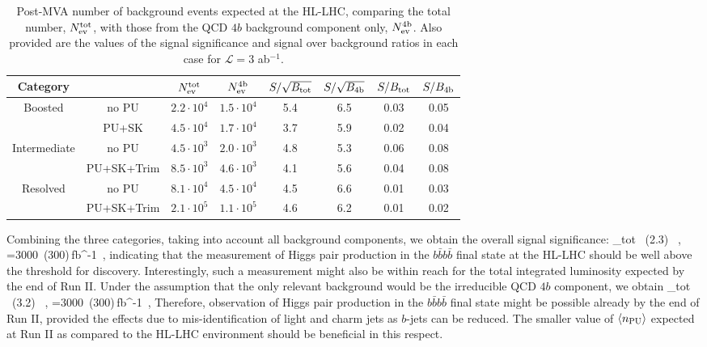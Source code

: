 \begin{table}[h]
  \centering
  \small
  \begin{tabular}{|c|c|c|c||c|c||c|c|}
        \hline
        Category  &    &  $N_{\rm ev}^{\rm tot}$  &  $N_{\rm ev}^{\rm 4b}$   &
        $S/\sqrt{B_{\rm tot}}$ & $S/\sqrt{B_{\rm 4b}}$  
        &  $S/B_{\rm tot}$ & $S/B_{\rm 4b}$\\ 
    \hline
    \hline
    \multirow{2}{*}{Boosted} &  no PU  & $2.2\cdot 10^4$  & $1.5\cdot 10^4$     & 
      5.4 &  6.5 & 0.03 & 0.05 \\
    & PU+SK &  $4.5\cdot 10^4$ &  $1.7\cdot 10^4$    &  3.7  & 5.9 &  0.02 & 0.04 \\
    \hline
    \hline
    \multirow{2}{*}{Intermediate} &  no PU   & $4.5\cdot 10^3$  & $2.0\cdot 10^3$    &
    4.8  &  5.3 &  0.06  &  0.08 \\
    & PU+SK+Trim  & $8.5\cdot 10^3$   &  $4.6\cdot 10^3$  & 4.1  & 5.6 & 0.04 & 0.08 \\
    \hline
    \hline
    \multirow{2}{*}{Resolved} &   no PU  & $8.1\cdot 10^4$   &
    $4.5\cdot 10^4$
    & 4.5  & 6.6  & 0.01 & 0.03 \\
    & PU+SK+Trim  &  $2.1\cdot 10^5$   &   $1.1\cdot 10^5$ & 4.6    & 6.2  & 0.01 & 0.02 \\
    \hline
      \end{tabular}
  \caption{\small Post-MVA number of background events
    expected at the HL-LHC, comparing the total number, $N_{\rm ev}^{\rm tot}$,
    with those from the QCD $4b$ background
    component only, $N_{\rm ev}^{\rm 4b}$.
    Also provided are the values of the signal 
    significance and signal over background ratios in each case
    for $\mathcal{L}=3$ ab$^{-1}$.
        \label{table:cutflowMVA_fakes}
  }
\end{table}

    
Combining the three categories, taking into
account all background components, we obtain the overall signal
significance:
\be
\lp {}\rp_{\rm tot} ~(2.3) \, ,\quad
{}=3000~(300)\,{\rm fb}^{-1}\, ,
\ee
%
indicating  that the measurement of
Higgs pair production in the $b\bar{b}b\bar{b}$ final state at the HL-LHC
should be 
well above the threshold for discovery.
%
Interestingly, such a measurement might also be within reach
for the total integrated luminosity expected by the end of Run II.
%
Under the  assumption that
    the only relevant background would be the irreducible QCD $4b$ component,
    we obtain
    \be
\lp {}\rp_{\rm tot} ~(3.2) \, ,\quad
{}=3000~(300)\,{\rm fb}^{-1}\, ,
\ee
Therefore, observation of Higgs pair production
in the $b\bar{b}b\bar{b}$ final state might be possible
already by the end of Run II, provided
the effects due to mis-identification of light and charm jets as
$b$-jets can be reduced.
%
The smaller value of $\left\langle n_{\rm PU}\right\rangle$ expected
at Run II as compared
to the HL-LHC environment should be beneficial in this respect.
